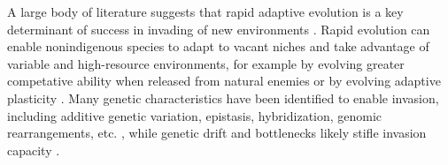 \documentclass[12pt]{article}\usepackage[]{graphicx}\usepackage[]{color}
\begin{document}
	
	A large body of literature suggests that rapid adaptive evolution is a key determinant of success in invading of new environments \parencite{Sakai2001,Reznick2001, Lambrinos2004,Williamson1997,Thompson1998, Cox2004, Prentis2008,Colautti2015,Lee2002invasion, Fenollosa2019,Clements2011}.  Rapid evolution can enable nonindigenous species to adapt to vacant niches and take advantage of variable and high-resource environments, for example by evolving greater competative ability  when released from natural enemies \parencite{Blossey1995,Bossdorf2005} or by evolving adaptive plasticity \parencite{Richards2006}. Many genetic characteristics have been identified to enable invasion, including additive genetic variation, epistasis, hybridization, genomic rearrangements, etc. \parencite[Reviewed in][]{Lee2002invasion}, while genetic drift and bottlenecks likely stifle invasion capacity \parencite{Bock2015}. 
	
\end{document}
